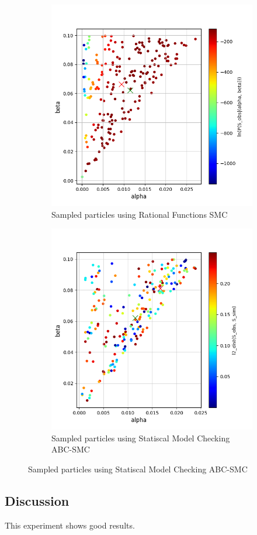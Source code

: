 \begin{figure}[H]
    \centering
    \begin{subfigure}{0.48\textwidth}
        \centering
        \includegraphics[width=\linewidth]{figures/sir1510_rfsmc_few.png}
        \caption{Sampled particles using Rational Functions SMC}
    \end{subfigure}
    \hfill
    \begin{subfigure}{0.48\textwidth}
        \centering
        \includegraphics[width=\linewidth]{figures/sir1510_abcsmc_few.png}
        \caption{Sampled particles using Statiscal Model Checking ABC-SMC}
    \end{subfigure}
\end{figure}

\subsection{Discussion}
This experiment shows good results.
